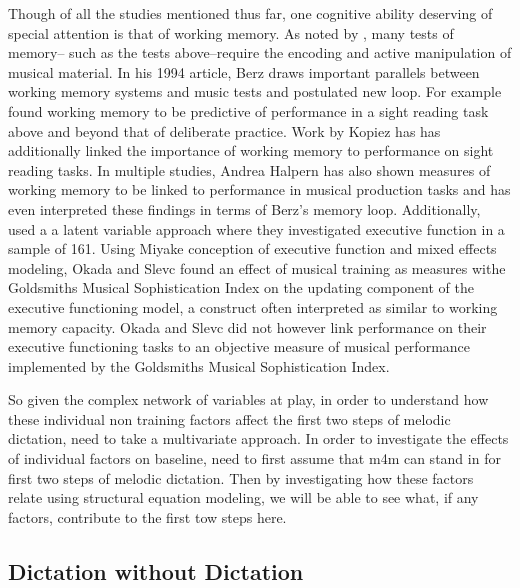 \documentclass[]{book}
\begin{document}
Though of all the studies mentioned thus far, one cognitive ability deserving of special attention is that of working memory.
As noted by \citep{berzWorkingMemoryMusic1995}, many tests of memory-- such as the tests above--require the encoding and active manipulation of musical material.
In his 1994 article, Berz draws important parallels between working memory systems and music tests and postulated new loop.
For example \citep{meinzDeliberatePracticeNecessary2010} found working memory to be predictive of performance in a sight reading task above and beyond that of deliberate practice.
Work by Kopiez \citep{kopiezDynamicModelSkills2006, kopiezGeneralModelSkills2008} has has additionally linked the importance of working memory to performance on sight reading tasks.
In multiple studies, Andrea Halpern has also shown measures of working memory to be linked to performance in musical production tasks \citep{halpernEffectsTimbreTempo2008, nicholsScoreOneJazz2018b} and has even interpreted these findings in terms of Berz's memory loop.
Additionally, \citep{okadaIndividualDifferencesMusical2018a} used a a latent variable approach where they investigated executive function in a sample of 161.
Using Miyake conception of executive function and mixed effects modeling, Okada and Slevc found an effect of musical training as measures withe Goldsmiths Musical Sophistication Index on the updating component of the executive functioning model, a construct often interpreted as similar to working memory capacity.
Okada and Slevc did not however link performance on their executive functioning tasks to an objective measure of musical performance implemented by the Goldsmiths Musical Sophistication Index.

So given the complex network of variables at play, in order to understand how these individual non training factors affect the first two steps of melodic dictation, need to take a multivariate approach.
In order to investigate the effects of individual factors on baseline, need to first assume that m4m can stand in for first two steps of melodic dictation.
Then by investigating how these factors relate using structural equation modeling, we will be able to see what, if any factors, contribute to the first tow steps here.

\hypertarget{dictation-without-dictation}{%
\subsection{Dictation without Dictation}\label{dictation-without-dictation}}
\end{document}
